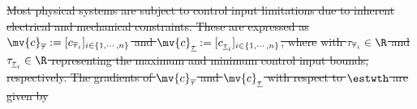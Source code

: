 \documentclass[letterpaper, journal]{IEEEtran}
\providecommand{\DIFdel}[1]{{\protect\color{red}\sout{#1}}} %
\begin{document}
\DIFdel{Most physical systems are subject to control input limitations due to inherent electrical and mechanical constraints.
These are expressed as $\mv{c}_{\overline \tau}:= [c_{\overline \tau_i}]_{i\in\{1,\cdots,n\}}$ and $\mv{c}_{\underline\tau}:= [c_{\underline\tau_i}]_{i\in\{1,\cdots,n\}}$, where
}%
\DIFdel{with $\tau_{\overline \tau_i}\in\R$ and $\tau_{\underline\tau_i}\in\R$ representing the maximum and minimum control input bounds, respectively.
The gradients of $\mv{c}_{\overline \tau}$ and $\mv{c}_{\underline\tau}$ with respect to $\estwth$ are given by
}%
\end{document}
